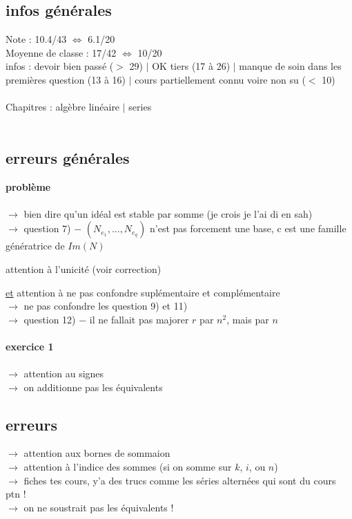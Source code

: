 \documentclass{book}
\begin{document}
\subsection{infos générales}

Note : 10.4/43 $\Leftrightarrow$ 6.1/20 \\
Moyenne de classe : 17/42 $\Leftrightarrow$ 10/20 \\
infos : devoir bien passé ($>$ 29) $|$ OK tiers (17 à 26) $|$ manque de soin dans les premières question (13 à 16) $|$ cours partiellement connu voire non su ($<$ 10) \\ \\
Chapitres : algèbre linéaire $|$ series \\ \\

\subsection{erreurs générales}

\textbf{\large{problème}} \\ \\
$\rightarrow$ bien dire qu'un idéal est stable par somme (je crois je l'ai di en sah) \\
$\rightarrow$ question 7) $-$ $(N_{e_1},...,N_{e_q})$ n'est pas forcement une base, c est une famille génératrice de $Im(N)$

attention à l'unicité (voir correction)

\underline{et} attention à ne pas confondre suplémentaire et complémentaire \\
$\rightarrow$ ne pas confondre les question 9) et 11) \\
$\rightarrow$ question 12) $-$ il ne fallait pas majorer $r$ par $n^2$, mais par $n$ \\ \\


\textbf{\large{exercice 1}} \\ \\
$\rightarrow$ attention au signes \\
$\rightarrow$ on additionne pas les équivalents \\


\subsection{erreurs}

$\rightarrow$ attention aux bornes de sommaion \\
$\rightarrow$ attention à l'indice des sommes (si on somme sur $k$, $i$, ou $n$) \\
$\rightarrow$ fiches tes cours, y'a des trucs comme les séries alternées qui sont du cours ptn ! \\
$\rightarrow$ on ne soustrait pas les équivalents ! \\
\end{document}
